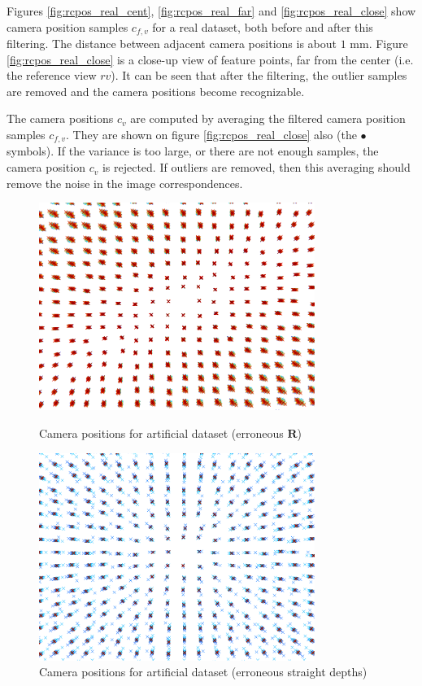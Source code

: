 \documentclass[11pt]{scrreprt}
\newcommand{\matr}[1]{\mathbf{#1}}
\begin{document}
Figures \ref{fig:rcpos_real_cent}, \ref{fig:rcpos_real_far} and \ref{fig:rcpos_real_close} show camera position samples $c_{f,v}$ for a real dataset, both before and after this filtering. The distance between adjacent camera positions is about $1\text{ mm}$. Figure \ref{fig:rcpos_real_close} is a close-up view of feature points, far from the center (i.e. the reference view $rv$). It can be seen that after the filtering, the outlier samples are removed and the camera positions become recognizable.

The camera positions $c_v$ are computed by averaging the filtered camera position samples $c_{f,v}$. They are shown on figure \ref{fig:rcpos_real_close} also (the $\bullet$ symbols). If the variance is too large, or there are not enough samples, the camera position $c_v$ is rejected. If outliers are removed, then this averaging should remove the noise in the image correspondences.


\begin{figure}[p]
\centering

\includegraphics[width=0.8\textwidth]{rcpos_art_wrongR.pdf}
\caption{Camera positions for artificial dataset (erroneous $\matr{R}$)}
\label{fig:rcpos_art_wrongR}

\vspace{1cm}

\includegraphics[width=0.8\textwidth]{rcpos_art_wrongD.pdf}
\caption{Camera positions for artificial dataset (erroneous straight depths)}
\label{fig:rcpos_art_wrongD}
\end{figure}
\end{document}
